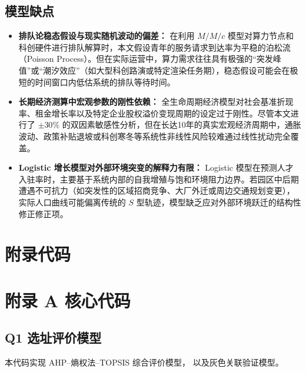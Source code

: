 \documentclass[12pt,a4paper]{article}
\begin{document}
\subsection{模型缺点}
\begin{itemize}
    \item \textbf{排队论稳态假设与现实随机波动的偏差：}
    在利用 $M/M/c$ 模型对算力节点和科创硬件进行排队解算时，本文假设青年的服务请求到达率为平稳的泊松流（Poisson Process）。但在实际运营中，算力需求往往具有极强的“突发峰值”或“潮汐效应”（如大型科创路演或特定渲染任务期），稳态假设可能会在极短的时间窗口内低估系统的排队等待时间。
    
    \item \textbf{长期经济测算中宏观参数的刚性依赖：}
    全生命周期经济模型对社会基准折现率、租金增长率以及特定企业股权溢价变现周期的设定过于刚性。尽管本文进行了 $\pm30\%$ 的双因素敏感性分析，但在长达10年的真实宏观经济周期中，通胀波动、政策补贴退坡或科创寒冬等系统性非线性风险较难通过线性扰动完全覆盖。
    
    \item \textbf{Logistic 增长模型对外部环境突变的解释力有限：}
    Logistic 模型在预测人才入驻率时，主要基于系统内部的自我增殖与饱和环境阻力边界。若园区中后期遭遇不可抗力（如突发性的区域招商竞争、大厂外迁或周边交通规划变更），实际人口曲线可能偏离传统的 $S$ 型轨迹，模型缺乏应对外部环境跃迁的结构性修正修正项。
\end{itemize}

\section{附录代码}


\section{附录 A 核心代码}

\subsection{Q1 选址评价模型}

本代码实现 AHP--熵权法--TOPSIS 综合评价模型，
以及灰色关联验证模型。
\end{document}
